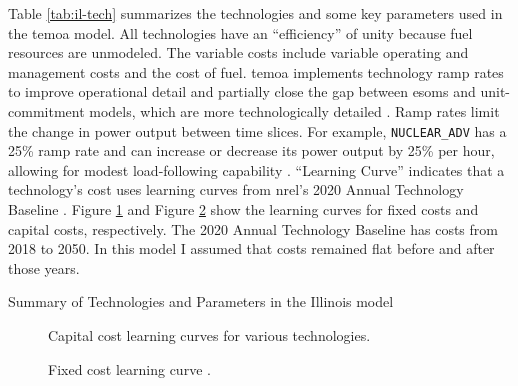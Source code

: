 Table \ref{tab:il-tech} summarizes the technologies and some key parameters
used in the \gls{temoa} model. All technologies have an ``efficiency'' of unity
because fuel resources are unmodeled. The variable costs
include variable operating and management costs and the cost of fuel. \gls{temoa}
implements technology ramp rates to improve operational detail and partially
close the gap between \glspl{esom} and unit-commitment models, which are more
technologically detailed \cite{de_queiroz_repurposing_2019}.
Ramp rates limit the change in power output between time slices. For example,
\texttt{NUCLEAR\_ADV} has a 25\% ramp rate and can increase or decrease
its power output by 25\% per hour, allowing for modest load-following capability
\cite{baseload_2017,lokhov_technical_2011}. ``Learning Curve'' indicates that a
technology's cost uses learning curves from \gls{nrel}'s 2020 Annual Technology
Baseline \cite{nrel_2020_2020}. Figure \ref{fig:capital_cost} and Figure
\ref{fig:fix_costs} show the learning curves for fixed costs and capital costs,
respectively. The 2020 Annual Technology Baseline has costs from 2018 to 2050. In this model
I assumed that costs remained flat before and after those years.

\begin{sidewaystable}
  \centering
  \caption{Summary of Technologies and Parameters in the Illinois model}
  \label{tab:il-tech}
  \resizebox{\textwidth}{!}{
  
  } %
\end{sidewaystable}


\begin{figure}[H]
  \centering
  \resizebox{0.6\textwidth}{!}{}
  \caption{Capital cost learning curves for various technologies.}
  \label{fig:capital_cost}
\end{figure}

\begin{figure}[H]
    \centering
    \resizebox{0.61\columnwidth}{!}{}
    \caption{Fixed cost learning curve \cite{nrel_2020_2020}.}
    \label{fig:fix_costs}
\end{figure}


